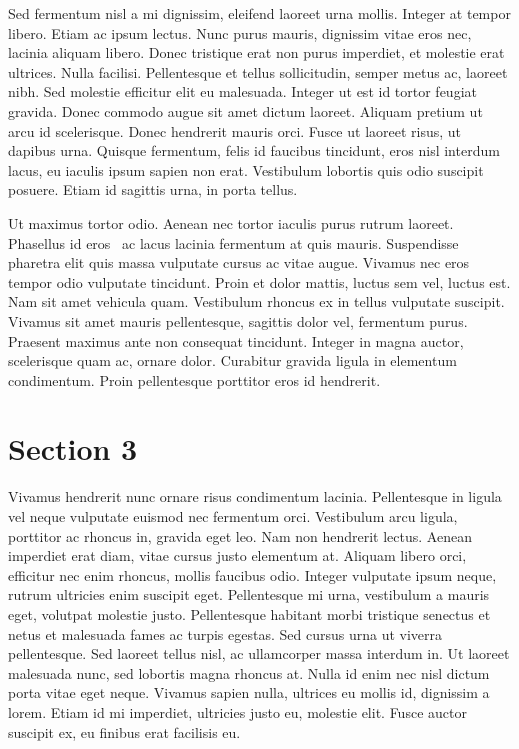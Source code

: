 \documentclass[a4paper, 10pt, conference]{ieeeconf}
\begin{document}
Sed fermentum nisl a mi dignissim, eleifend laoreet urna mollis. Integer at tempor libero. Etiam ac ipsum lectus. Nunc purus mauris, dignissim vitae eros nec, lacinia aliquam libero. Donec tristique erat non purus imperdiet, et molestie erat ultrices. Nulla facilisi. Pellentesque et tellus sollicitudin, semper metus ac, laoreet nibh. Sed molestie efficitur elit eu malesuada. Integer ut est id tortor feugiat gravida. Donec commodo augue sit amet dictum laoreet. Aliquam pretium ut arcu id scelerisque. Donec hendrerit mauris orci. Fusce ut laoreet risus, ut dapibus urna. Quisque fermentum, felis id faucibus tincidunt, eros nisl interdum lacus, eu iaculis ipsum sapien non erat. Vestibulum lobortis quis odio suscipit posuere. Etiam id sagittis urna, in porta tellus.

Ut maximus tortor odio. Aenean nec tortor iaculis purus rutrum laoreet. Phasellus id eros~\cite{latex} ac lacus lacinia fermentum at quis mauris. Suspendisse pharetra elit quis massa vulputate cursus ac vitae augue. Vivamus nec eros tempor odio vulputate tincidunt. Proin et dolor mattis, luctus sem vel, luctus est. Nam sit amet vehicula quam. Vestibulum rhoncus ex in tellus vulputate suscipit. Vivamus sit amet mauris pellentesque, sagittis dolor vel, fermentum purus. Praesent maximus ante non consequat tincidunt. Integer in magna auctor, scelerisque quam ac, ornare dolor. Curabitur gravida ligula in elementum condimentum. Proin pellentesque porttitor eros id hendrerit.

\section{Section 3}

Vivamus hendrerit nunc ornare risus condimentum lacinia. Pellentesque in ligula vel neque vulputate euismod nec fermentum orci. Vestibulum arcu ligula, porttitor ac rhoncus in, gravida eget leo. Nam non hendrerit lectus. Aenean imperdiet erat diam, vitae cursus justo elementum at. Aliquam libero orci, efficitur nec enim rhoncus, mollis faucibus odio. Integer vulputate ipsum neque, rutrum ultricies enim suscipit eget. Pellentesque mi urna, vestibulum a mauris eget, volutpat molestie justo. Pellentesque habitant morbi tristique senectus et netus et malesuada fames ac turpis egestas. Sed cursus urna ut viverra pellentesque. Sed laoreet tellus nisl, ac ullamcorper massa interdum in. Ut laoreet malesuada nunc, sed lobortis magna rhoncus at. Nulla id enim nec nisl dictum porta vitae eget neque. Vivamus sapien nulla, ultrices eu mollis id, dignissim a lorem. Etiam id mi imperdiet, ultricies justo eu, molestie elit. Fusce auctor~\cite{ieee-write} suscipit ex, eu finibus erat facilisis eu.
\end{document}
